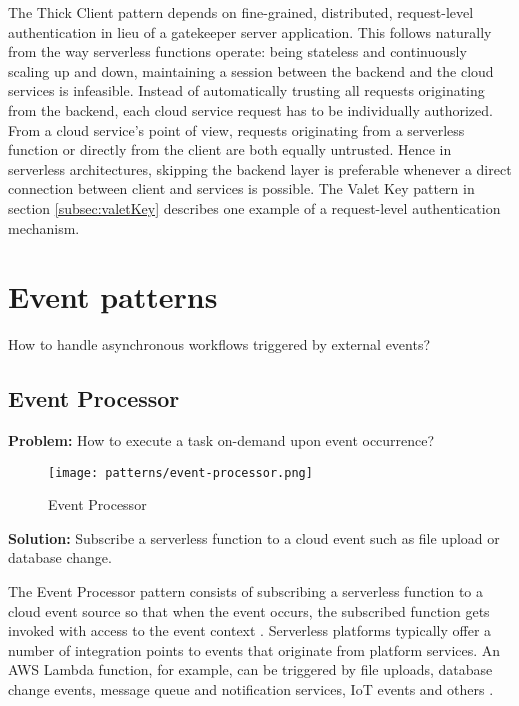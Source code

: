The Thick Client pattern depends on fine-grained, distributed, request-level authentication in lieu of a gatekeeper server application. This follows naturally from the way serverless functions operate: being stateless and continuously scaling up and down, maintaining a session between the backend and the cloud services is infeasible. Instead of automatically trusting all requests originating from the backend, each cloud service request has to be individually authorized. From a cloud service's point of view, requests originating from a serverless function or directly from the client are both equally untrusted. Hence in serverless architectures, skipping the backend layer is preferable whenever a direct connection between client and services is possible. The Valet Key pattern in section \ref{subsec:valetKey} describes one example of a request-level authentication mechanism. \parencite{adzic2017serverless}

\section{Event patterns} \label{sec:eventPatterns}

How to handle asynchronous workflows triggered by external events?

\subsection{Event Processor} \label{subsec:Eventprocessing}

\textbf{Problem:} How to execute a task on-demand upon event occurrence?

\begin{figure}[h]
  \centering
  \texttt{[image: patterns/event-processor.png]}
  \caption{Event Processor}
  \label{fig:patternEventProcessor}
\end{figure}

\textbf{Solution:} Subscribe a serverless function to a cloud event such as file upload or database change.

The Event Processor pattern consists of subscribing a serverless function to a cloud event source so that when the event occurs, the subscribed function gets invoked with access to the event context \parencite{hong18securingviaserverlesspatterns}. Serverless platforms typically offer a number of integration points to events that originate from platform services. An AWS Lambda function, for example, can be triggered by file uploads, database change events, message queue and notification services, IoT events and others \parencite{awslambda0218}.

